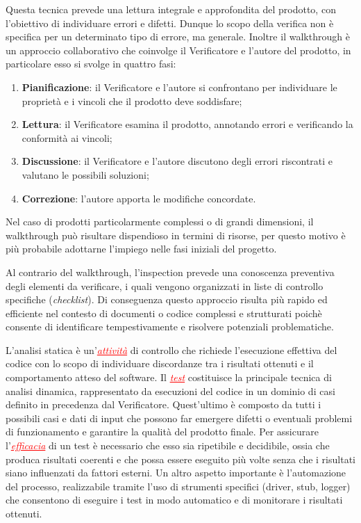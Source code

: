\begin{itemize}
Questa tecnica prevede una lettura integrale e approfondita del prodotto, con l'obiettivo di individuare errori e difetti. Dunque lo scopo della verifica
non è specifica per un determinato tipo di errore, ma generale. Inoltre il walkthrough è un approccio collaborativo che coinvolge il Verificatore
e l'autore del prodotto, in particolare esso si svolge in quattro fasi:
\begin{enumerate}
    \item \textbf{Pianificazione}: il Verificatore e l'autore si confrontano per individuare le proprietà e i vincoli che il prodotto deve soddisfare;
    \item \textbf{Lettura}: il Verificatore esamina il prodotto, annotando errori e verificando la conformità ai vincoli;
    \item \textbf{Discussione}: il Verificatore e l'autore discutono degli errori riscontrati e valutano le possibili soluzioni;
    \item \textbf{Correzione}: l'autore apporta le modifiche concordate.
\end{enumerate}
Nel caso di prodotti particolarmente complessi o di grandi dimensioni, il walkthrough può risultare dispendioso in termini di risorse,
per questo motivo è più probabile adottarne l'impiego nelle fasi iniziali del progetto.

Al contrario del walkthrough, l'inspection prevede una conoscenza preventiva degli elementi da verificare, i quali vengono organizzati in
liste di controllo specifiche (\textit{checklist}). Di conseguenza questo approccio risulta più rapido ed efficiente nel contesto di documenti
o codice complessi e strutturati poichè consente di identificare tempestivamente e risolvere potenziali problematiche.

L'analisi statica è un'\textcolor{red}{\uline{\textit{attività}}} di controllo che richiede l'esecuzione effettiva del codice con lo scopo di
individuare discordanze tra i risultati ottenuti e il comportamento atteso del software. Il \textcolor{red}{\uline{\textit{test}}} costituisce
la principale tecnica di analisi dinamica, rappresentato da esecuzioni del codice in un dominio di casi definito in precedenza dal Verificatore.
Quest'ultimo è composto da tutti i possibili casi e dati di input che possono far emergere difetti o eventuali problemi di funzionamento e
garantire la qualità del prodotto finale. Per assicurare l'\textcolor{red}{\uline{\textit{efficacia}}} di un test è necessario
che esso sia ripetibile e decidibile, ossia che produca risultati coerenti e che possa essere eseguito più volte senza che 
i risultati siano influenzati da fattori esterni. Un altro aspetto importante è l'automazione del processo, realizzabile tramite l'uso di
strumenti specifici (driver, stub, logger) che consentono di eseguire i test in modo automatico e di monitorare i risultati ottenuti.


\end{itemize}
